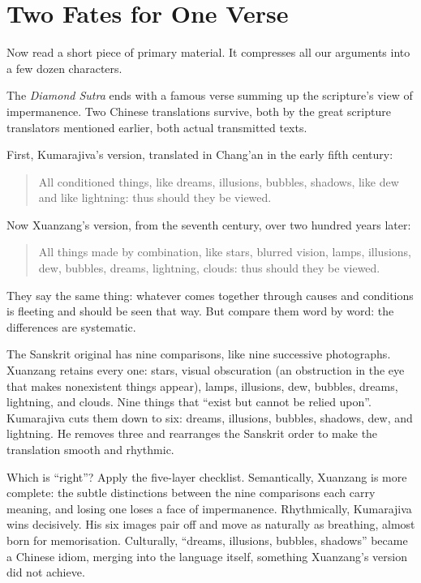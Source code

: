 \section{Two Fates for One Verse}
Now read a short piece of primary material. It compresses all our arguments into a few dozen characters.

The \emph{Diamond Sutra} ends with a famous verse summing up the scripture's view of impermanence. Two Chinese translations survive, both by the great scripture translators mentioned earlier, both actual transmitted texts.

First, Kumarajiva's version, translated in Chang'an in the early fifth century:

\begin{quote}
All conditioned things, like dreams, illusions, bubbles, shadows, like dew and like lightning: thus should they be viewed.
\end{quote}
Now Xuanzang's version, from the seventh century, over two hundred years later:

\begin{quote}
All things made by combination, like stars, blurred vision, lamps, illusions, dew, bubbles, dreams, lightning, clouds: thus should they be viewed.
\end{quote}
They say the same thing: whatever comes together through causes and conditions is fleeting and should be seen that way. But compare them word by word: the differences are systematic.

The Sanskrit original has nine comparisons, like nine successive photographs. Xuanzang retains every one: stars, visual obscuration (an obstruction in the eye that makes nonexistent things appear), lamps, illusions, dew, bubbles, dreams, lightning, and clouds. Nine things that ``exist but cannot be relied upon''. Kumarajiva cuts them down to six: dreams, illusions, bubbles, shadows, dew, and lightning. He removes three and rearranges the Sanskrit order to make the translation smooth and rhythmic.

Which is ``right''? Apply the five-layer checklist. Semantically, Xuanzang is more complete: the subtle distinctions between the nine comparisons each carry meaning, and losing one loses a face of impermanence. Rhythmically, Kumarajiva wins decisively. His six images pair off and move as naturally as breathing, almost born for memorisation. Culturally, ``dreams, illusions, bubbles, shadows'' became a Chinese idiom, merging into the language itself, something Xuanzang's version did not achieve.

